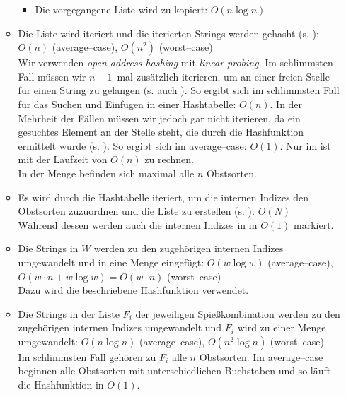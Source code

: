 \begin{itemize}
\begin{itemize}
\begin{itemize}
      \item Die vorgegangene Liste wird zu  kopiert: $O(n \log n)$
    \end{itemize}

    \item Die Liste  wird iteriert und die iterierten Strings werden gehasht (s. ): $O(n)$ (average--case), $O(n^2)$ (worst--case)\\
    Wir verwenden \textit{open address hashing} mit \textit{linear probing}.
    Im schlimmsten Fall müssen wir $n - 1$--mal zusätzlich iterieren, um an einer freien Stelle für einen
    String zu gelangen (s. auch ).
    So ergibt sich im schlimmsten Fall für das Suchen und Einfügen in einer Hashtabelle: $O(n)$.
    In der Mehrheit der Fällen müssen wir jedoch gar nicht iterieren, da ein gesuchtes Element
    an der Stelle steht, die durch die Hashfunktion ermittelt wurde (s. ).
    So ergibt sich im average--case: $O(1)$.
    Nur im  ist mit der Laufzeit von $O(n)$ zu rechnen.\\
    In der Menge  befinden sich maximal alle $n$ Obstsorten.

    \item Es wird durch die Hashtabelle iteriert, um die internen Indizes den Obstsorten zuzuordnen
    und die Liste  zu erstellen (s. ): $O(N)$\\
    Während dessen werden auch die internen Indizes in  in $O(1)$ markiert.

    \item Die Strings in $W$ werden zu den zugehörigen internen Indizes umgewandelt und in eine Menge eingefügt:
    $O(w \log w)$ (average--case), $O(w \cdot n + w \log w) = O(w \cdot n)$ (worst--case)\\
    Dazu wird die beschriebene Hashfunktion verwendet.

    \item Die Strings in der Liste $F_i$ der jeweiligen Spießkombination werden
    zu den zugehörigen internen Indizes umgewandelt und $F_i$ wird zu einer Menge umgewandelt:
    $O(n \log n)$ (average--case), $O(n^2 \log n)$ (worst--case)\\
    Im schlimmsten Fall gehören zu $F_i$ alle $n$ Obstsorten. 
    Im average--case beginnen alle Obstsorten mit unterschiedlichen Buchstaben und
    so läuft die Hashfunktion in $O(1)$.


\end{itemize}
\end{itemize}
